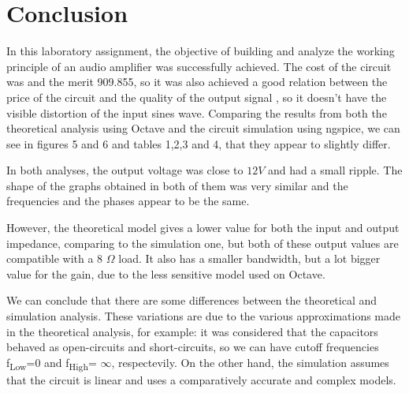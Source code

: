 \section{Conclusion}
\label{sec:conclusion}
In this laboratory assignment, the objective of building and analyze the working principle of an audio amplifier was successfully achieved.
The cost of the circuit was  and the merit 909.855, so it was also achieved a good relation between the price of the circuit and the quality of the output signal , so it doesn't have the visible distortion of the input sines wave.
Comparing the results from both the theoretical analysis using Octave and the circuit simulation using ngspice, we can see in figures 5 and 6 and tables 1,2,3 and 4, that they appear to slightly differ.

In both analyses, the output voltage was close to $12 V$ and had a small ripple. The shape of the graphs obtained in both of them was very similar and the frequencies and the phases appear to be the same.

However, the theoretical model gives a lower value for both the input and output impedance, comparing to the simulation one, but both of these output values are compatible with a 8 $\Omega$ load. It also has a smaller bandwidth, but a lot bigger value for the gain, due to the less sensitive model used on Octave. 

We can conclude that there are some differences between the theoretical and simulation analysis. These variations are due to the various approximations made in the theoretical analysis, for example: it was considered that the capacitors behaved as open-circuits and short-circuits, so we can have cutoff frequencies f\textsubscript{Low}=0 and f\textsubscript{High}= $\infty$, respectevily. On the other hand, the simulation assumes that the circuit is linear and uses a comparatively accurate and complex models.  





